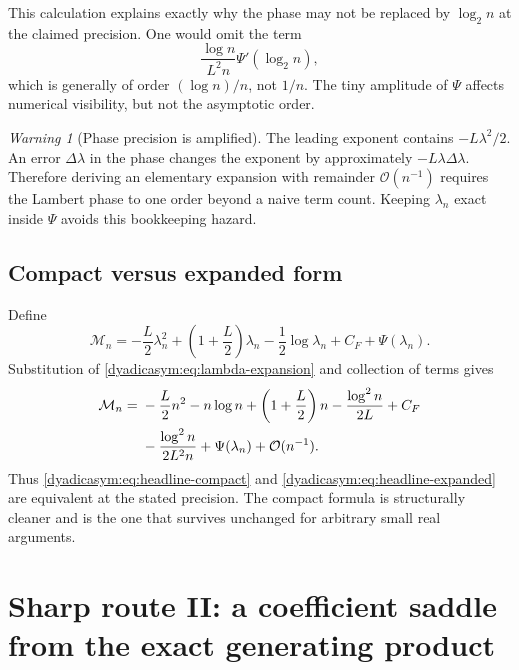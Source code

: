 \documentclass[11pt,oneside]{article}
\theoremstyle{definition}
\theoremstyle{remark}
\newtheorem{warning}[theorem]{Warning}
\newcommand{\bigO}{\mathcal O}
\begin{document}
This calculation explains exactly why the phase may not be replaced by $\log_2n$ at the
claimed precision.  One would omit the term
\begin{equation}
 \frac{\log n}{L^2n}\Psi'(\log_2n),                         \label{dyadicasym:eq:missing-phase-term}
\end{equation}
which is generally of order $(\log n)/n$, not $1/n$.  The tiny amplitude of $\Psi$ affects
numerical visibility, but not the asymptotic order.

\begin{warning}[Phase precision is amplified]
The leading exponent contains $-L\lambda^2/2$.  An error $\Delta\lambda$ in the phase changes
the exponent by approximately $-L\lambda\Delta\lambda$.  Therefore deriving an elementary
expansion with remainder $\bigO(n^{-1})$ requires the Lambert phase to one order beyond a
naive term count.  Keeping $\lambda_n$ exact inside $\Psi$ avoids this bookkeeping hazard.
\end{warning}

\subsection{Compact versus expanded form}

Define
\begin{equation}
 \mathcal M_n=-\frac L2\lambda_n^2+
 \left(1+\frac L2\right)\lambda_n-\frac12\log\lambda_n
 +C_F+\Psi(\lambda_n).                                     \label{dyadicasym:eq:Mn}
\end{equation}
Substitution of \eqref{dyadicasym:eq:lambda-expansion} and collection of terms gives
\begin{align}
 \mathcal M_n={}&-\frac L2n^2-n\log n+
 \left(1+\frac L2\right)n-\frac{\log^2n}{2L}+C_F           \notag\\
 &-\frac{\log^2n}{2L^2n}+\Psi(\lambda_n)+\bigO(n^{-1}).   \label{dyadicasym:eq:compact-to-expanded}
\end{align}
Thus \eqref{dyadicasym:eq:headline-compact} and \eqref{dyadicasym:eq:headline-expanded} are equivalent at the stated
precision.  The compact formula is structurally cleaner and is the one that survives
unchanged for arbitrary small real arguments.

\section{Sharp route II: a coefficient saddle from the exact generating product}
\label{dyadicasym:sec:coefficient-saddle}
\end{document}

